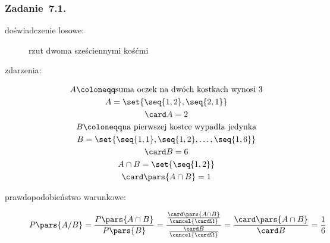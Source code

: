 \subsubsection*{Zadanie~7.1.}
\begin{description}
    \item[doświadczenie losowe:] rzut dwoma sześciennymi kośćmi
    \item[zdarzenia:]
        \begin{gather*}
            A \coloneqq \text{suma oczek na dwóch kostkach wynosi \(3\)}\\
            A = \set{\seq{1, 2}, \seq{2, 1}}\\
            \card A = 2\\
            B \coloneqq \text{na pierwszej kostce wypadła jedynka}\\
            B = \set{\seq{1, 1}, \seq{1, 2}, \ldots, \seq{1, 6}}\\
            \card B = 6\\
            A \cap B = \set{\seq{1, 2}}\\
            \card\pars{A \cap B} = 1
        \end{gather*}
    \item[prawdopodobieństwo warunkowe:]
        \begin{equation*}
            P\pars{A / B}
                = \frac{P\pars{A \cap B}}{P\pars{B}}
                = \frac{\frac{\card\pars{A \cap B}}{\cancel{\card\Omega}}}{\frac{\card B}{\cancel{\card\Omega}}}
                = \frac{\card\pars{A \cap B}}{\card B}
                = \frac{1}{6}
        \end{equation*}
\end{description}
